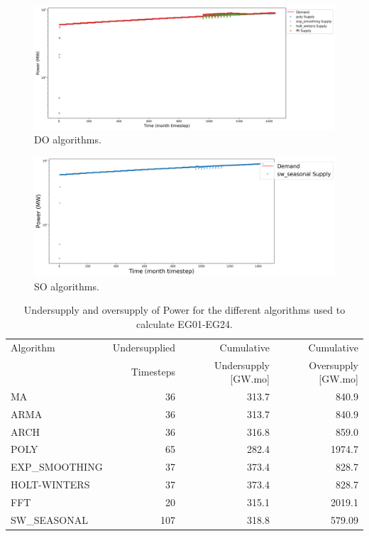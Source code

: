\documentclass[11pt]{article}
\begin{document}
\begin{figure}[!h]
	\centering
	\includegraphics[width=\textwidth]{24-figures/lin-24-power-buffer02.png} 
	\hfill
	\caption{DO algorithms.}
	\label{fig:24-lin-DO}
\end{figure}

\begin{figure}[!h]
	\centering
	\includegraphics[width=\textwidth]{24-figures/lin-24-power-buffer03.png} 
	\hfill
	\caption{SO algorithms.}
	\label{fig:24-lin-SO}
\end{figure}

\begin{table}[!h]
	\centering
	\caption{Undersupply and oversupply of Power for the different algorithms used to calculate EG01-EG24.}
	\label{tab:24-lin-power}
	\begin{tabularx}{\textwidth}{lRRR}
		\hline
		Algorithm & Undersupplied & Cumulative  & Cumulative \\
		& Timesteps     & Undersupply [GW.mo]  & Oversupply [GW.mo] \\ \hline
		MA        & 36 	& 313.7 & 840.9 \\ 
		ARMA      & 36 	& 313.7 & 840.9 \\ 
		ARCH      & 36 	& 316.8 & 859.0 \\ 
		POLY      &  65 & 282.4 & 1974.7 \\ 
		EXP\_SMOOTHING 	& 37 & 373.4 & 828.7 \\ 
		HOLT-WINTERS  	& 37 & 373.4 & 828.7 \\ 
		FFT       & 20	& 315.1	& 2019.1 \\ 
		SW\_SEASONAL    & 107 & 318.8 & 579.09 \\ \hline
	\end{tabularx}
\end{table}
\end{document}

